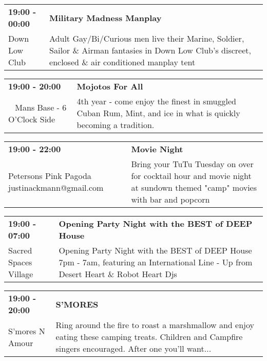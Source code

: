 \begin{tabular}{ p{1in} p{2.2in} }
    \textbf{19:00 - 00:00} & \textbf{Military Madness Manplay} \\
    Down Low Club \newline  & Adult Gay/Bi/Curious men live their Marine, Soldier, Sailor \& Airman fantasies in Down Low Club's discreet, enclosed \& air conditioned manplay tent \\
    \hline 
\end{tabular}
    
\begin{tabular}{ p{1in} p{2.2in} }
    \textbf{19:00 - 20:00} & \textbf{Mojotos For All} \\
    ~ \newline Mans Base - 6 O'Clock Side & 4th year - come enjoy the finest in smuggled Cuban Rum, Mint, and ice in what is quickly becoming a tradition. \\
    \hline 
\end{tabular}
    
\begin{tabular}{ p{1in} p{2.2in} }
    \textbf{19:00 - 22:00} & \textbf{Movie Night} \\
    Petersons Pink Pagoda \newline justinackmann@gmail.com & Bring your TuTu Tuesday on over for cocktail hour and movie night at sundown themed "camp" movies with bar and popcorn \\
    \hline 
\end{tabular}
    
\begin{tabular}{ p{1in} p{2.2in} }
    \textbf{19:00 - 07:00} & \textbf{Opening Party Night with the BEST of DEEP House} \\
    Sacred Spaces Village \newline  & Opening Party Night with the BEST of DEEP House 7pm - 7am, featuring an International Line - Up from Desert Heart \& Robot Heart Djs \\
    \hline 
\end{tabular}
    
\begin{tabular}{ p{1in} p{2.2in} }
    \textbf{19:00 - 20:00} & \textbf{S'MORES} \\
    S'mores N Amour \newline  & Ring around the fire to roast a marshmallow and enjoy eating these camping treats. Children and Campfire singers encouraged. After one you'll want... \\
    \hline 
\end{tabular}
    
